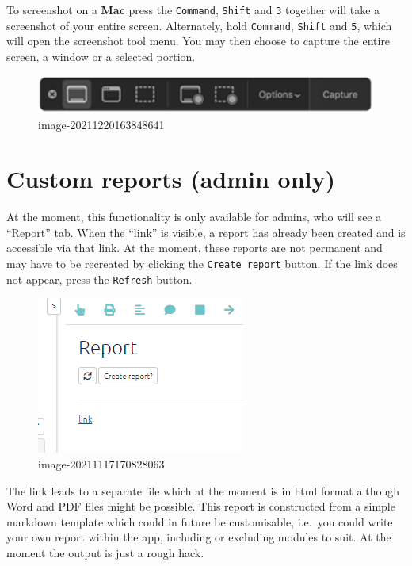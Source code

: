 \documentclass[
]{book}
\begin{document}
To screenshot on a \textbf{Mac} press the \texttt{Command}, \texttt{Shift} and \texttt{3} together will take a screenshot of your entire screen. Alternately, hold \texttt{Command}, \texttt{Shift} and \texttt{5}, which will open the screenshot tool menu. You may then choose to capture the entire screen, a window or a selected portion.

\begin{figure}
\centering
\includegraphics[width=6.77083in,height=\textheight]{_assets/image-20211220163848641.png}
\caption{image-20211220163848641}
\end{figure}

\hypertarget{custom-reports-admin-only}{%
\chapter{Custom reports (admin only)}\label{custom-reports-admin-only}}

At the moment, this functionality is only available for admins, who will see a ``Report'' tab. When the ``link'' is visible, a report has already been created and is accessible via that link. At the moment, these reports are not permanent and may have to be recreated by clicking the \texttt{Create\ report} button. If the link does not appear, press the \texttt{Refresh} button.

\begin{figure}
\centering
\includegraphics{_assets/image-20211117170828063.png}
\caption{image-20211117170828063}
\end{figure}

The link leads to a separate file which at the moment is in html format although Word and PDF files might be possible. This report is constructed from a simple markdown template which could in future be customisable, i.e.~you could write your own report within the app, including or excluding modules to suit. At the moment the output is just a rough hack.
\end{document}
